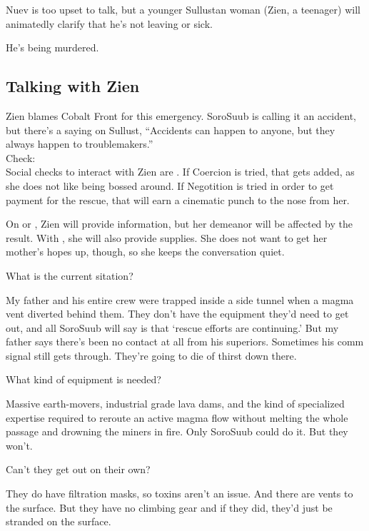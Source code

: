 \documentclass{book}
\newcommand{\df}{\difficulty}
\begin{document}
\begin{multicols*}{2}
Nuev is too upset to talk, but a younger Sullustan woman (Zien, a teenager) will animatedly clarify that he’s not leaving or sick.
\begin{quoting}
He’s being murdered.
\end{quoting}

\subsection{Talking with Zien}
Zien blames Cobalt Front for this emergency. SoroSuub is calling it an accident, but there’s a saying on Sullust, ``Accidents can happen to anyone, but they always happen to troublemakers.''\\
Check:\\
Social checks to interact with Zien are \df\df. If Coercion is tried, that gets \setback added, as she does not like being bossed around. If Negotition is tried in order to get payment for the rescue, that will earn a cinematic punch to the nose from her. 

On \success or \failure, Zien will provide information, but her demeanor will be affected by the result. With \success, she will also provide supplies. She does not want to get her mother's hopes up, though, so she keeps the conversation quiet. 

What is the current sitation?\\
\begin{quoting}
My father and his entire crew were trapped inside a side tunnel when a magma vent diverted behind them. They don’t have the equipment they’d need to get out, and all SoroSuub will say is that ‘rescue efforts are continuing.’ But my father says there’s been no contact at all from his superiors. Sometimes his comm signal still gets through. They’re going to die of thirst down there.
\end{quoting}

What kind of equipment is needed? \\
\begin{quoting}
Massive earth-movers, industrial grade lava dams, and the kind of specialized expertise required to reroute an active magma flow without melting the whole passage and drowning the miners in fire. Only SoroSuub could do it. But they won’t.
\end{quoting}

Can't they get out on their own?  \\
\begin{quoting}
They do have filtration masks, so toxins aren’t an issue. And there are vents to the surface. But they have no climbing gear and if they did, they’d just be stranded on the surface.
\end{quoting}


\end{multicols*}
\end{document}
